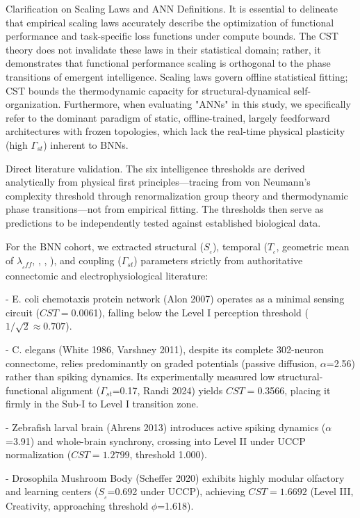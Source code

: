 \documentclass[a4paper,12pt]{article}
\begin{document}
Clarification on Scaling Laws and ANN Definitions. It is essential to delineate that empirical scaling laws accurately describe the optimization of functional performance and task-specific loss functions under compute bounds. The CST theory does not invalidate these laws in their statistical domain; rather, it demonstrates that functional performance scaling is orthogonal to the phase transitions of emergent intelligence. Scaling laws govern offline statistical fitting; CST bounds the thermodynamic capacity for structural-dynamical self-organization. Furthermore, when evaluating "ANNs" in this study, we specifically refer to the dominant paradigm of static, offline-trained, largely feedforward architectures with frozen topologies, which lack the real-time physical plasticity (high $\Gamma_{st}$) inherent to BNNs.


Direct literature validation. The six intelligence thresholds are derived analytically from physical first principles---tracing from von Neumann's complexity threshold through renormalization group theory and thermodynamic phase transitions---not from empirical fitting. The thresholds then serve as predictions to be independently tested against established biological data.


For the BNN cohort, we extracted structural ($S_{_c}$), temporal ($T_{_c}$, geometric mean of $\lambda_{_eff}$, \Phi, \Psi, \Theta), and coupling ($\Gamma_{st}$) parameters strictly from authoritative connectomic and electrophysiological literature:


- E. coli chemotaxis protein network (Alon 2007) operates as a minimal sensing circuit ($CST = $0.0061), falling below the Level I perception threshold ($1/\sqrt{2} \approx 0.707$).


- C. elegans (White 1986, Varshney 2011), despite its complete 302-neuron connectome, relies predominantly on graded potentials (passive diffusion, $\alpha$=2.56) rather than spiking dynamics. Its experimentally measured low structural-functional alignment ($\Gamma_{st}$=0.17, Randi 2024) yields $CST = $0.3566, placing it firmly in the Sub-I to Level I transition zone.


- Zebrafish larval brain (Ahrens 2013) introduces active spiking dynamics ($\alpha$=3.91) and whole-brain synchrony, crossing into Level II under UCCP normalization ($CST = 1.2799$, threshold 1.000).


- Drosophila Mushroom Body (Scheffer 2020) exhibits highly modular olfactory and learning centers ($S_{_c}$=0.692 under UCCP), achieving $CST = 1.6692$ (Level III, Creativity, approaching threshold $\phi$=1.618).
\end{document}
